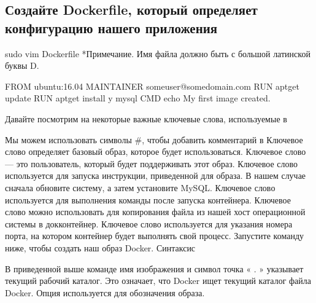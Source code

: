 \documentclass[letterpaper,10pt,russian]{sphinxmanual}
\begin{document}
\subsection{Создайте Dockerfile, который определяет конфигурацию нашего приложения}
\label{\detokenize{educational_materials/docker_hub/content:dockerfile}}
\sphinxAtStartPar
sudo vim Dockerfile
*Примечание. Имя файла должно быть  с большой латинской буквы D.

\begin{sphinxVerbatim}[commandchars=\\\{\}]
FROM ubuntu:16.04
MAINTAINER someuser@somedomain.com
RUN apt\PYGZhy{}get update
RUN apt\PYGZhy{}get install \textendash{}y mysql
CMD echo \PYGZdq{}My first image created.
\end{sphinxVerbatim}

\sphinxAtStartPar
Давайте посмотрим на некоторые важные ключевые слова, используемые в 

\sphinxAtStartPar
Мы можем использовать символы \#, чтобы добавить комментарий в 
Ключевое слово  определяет базовый образ, которое будет использоваться.
Ключевое слово  — это пользователь, который будет поддерживать этот образ.
Ключевое слово  используется для запуска инструкции, приведенной для образа. В нашем случае сначала обновите систему, а затем установите MySQL.
Ключевое слово  используется для выполнения команды после запуска контейнера.
Ключевое слово  можно использовать для копирования файла из нашей хост операционной системы в док\sphinxhyphen{}контейнер.
Ключевое слово  используется для указания номера порта, на котором контейнер будет выполнять свой процесс.
Запустите команду ниже, чтобы создать наш образ Docker.
Синтаксис

\sphinxAtStartPar
{}
В приведенной выше команде имя изображения и символ точка « . » указывает текущий рабочий каталог. Это означает, что Docker ищет текущий каталог файла Docker. Опция  используется для обозначения образа.
\end{document}
